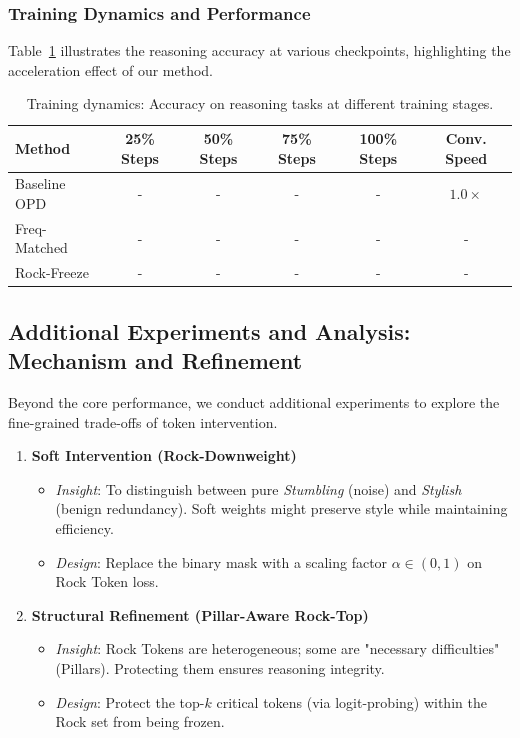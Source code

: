 \subsubsection{Training Dynamics and Performance}
Table~\ref{tab:main_results} illustrates the reasoning accuracy at various checkpoints, highlighting the acceleration effect of our method.

\begin{table}[h]
\centering
\caption{Training dynamics: Accuracy on reasoning tasks at different training stages.}
\label{tab:main_results}
\begin{tabular}{lccccc}
\toprule
\textbf{Method} & \textbf{25\% Steps} & \textbf{50\% Steps} & \textbf{75\% Steps} & \textbf{100\% Steps} & \textbf{Conv. Speed} \\ \midrule
Baseline OPD    & -                   & -                   & -                   & -                    & $1.0\times$          \\
Freq-Matched    & -                   & -                   & -                   & -                    & -                    \\
Rock-Freeze     & -                   & -                   & -                   & -                    & -                    \\ \bottomrule
\end{tabular}
\end{table}

\subsection{Additional Experiments and Analysis: Mechanism and Refinement}
Beyond the core performance, we conduct additional experiments to explore the fine-grained trade-offs of token intervention.

\begin{enumerate}
    \item \textbf{Soft Intervention (Rock-Downweight)}
    \begin{itemize}
        \item \textit{Insight}: To distinguish between pure \textit{Stumbling} (noise) and \textit{Stylish} (benign redundancy). Soft weights might preserve style while maintaining efficiency.
        \item \textit{Design}: Replace the binary mask with a scaling factor $\alpha \in (0, 1)$ on Rock Token loss.
    \end{itemize}
    \item \textbf{Structural Refinement (Pillar-Aware Rock-Top)}
    \begin{itemize}
        \item \textit{Insight}: Rock Tokens are heterogeneous; some are "necessary difficulties" (Pillars). Protecting them ensures reasoning integrity.
        \item \textit{Design}: Protect the top-$k$ critical tokens (via logit-probing) within the Rock set from being frozen.
    \end{itemize}
\end{enumerate}

